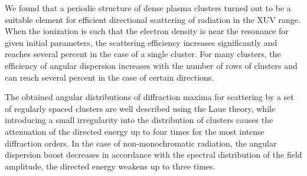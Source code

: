 We found that a periodic structure of dense plasma clusters turned out to be a suitable element for efficient directional scattering of radiation in the XUV range. When the ionization is such that the electron density is near the resonance for given initial parameters, the scattering efficiency increases significantly and reaches several percent in the case of a single cluster. For many clusters, the efficiency of angular dispersion increases with the number of rows of clusters and can reach several percent in the case of certain directions.

The obtained angular distributions of diffraction maxima for scattering by a set of regularly spaced clusters are well described using the Laue theory, while introducing a small irregularity into the distribution of clusters causes the attenuation of the directed energy up to four times for the most intense diffraction orders. In the case of non-monochromatic radiation, the angular dispersion boost decreases in accordance with the spectral distribution of the field amplitude, the directed energy weakens up to three times.
